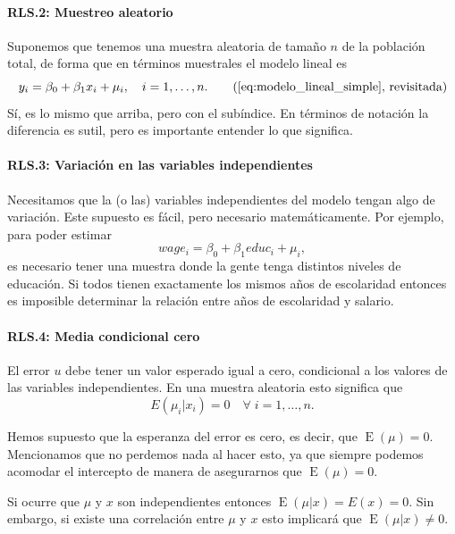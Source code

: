\documentclass[12pt]{report}\usepackage[]{graphicx}\usepackage[]{color}
\newcommand{\E}{\operatorname{E}}
\begin{document}
\paragraph{RLS.2: Muestreo aleatorio} Suponemos que tenemos una muestra aleatoria de tamaño $n$ de la población total, de forma que en términos muestrales el modelo lineal es
\begin{equation}
y_i = \beta_0 + \beta_1 x_i + \mu_i, \quad i = 1,\ldots,n. \tag{\ref{eq:modelo_lineal_simple}, revisitada}
\end{equation}
Sí, es lo mismo que arriba, pero con el subíndice. En términos de notación la diferencia es sutil, pero es importante entender lo que significa.

\paragraph{RLS.3: Variación en las variables independientes}
Necesitamos que la (o las) variables independientes del modelo tengan algo de variación.
Este supuesto es fácil, pero necesario matemáticamente.
Por ejemplo, para poder estimar
\begin{equation*}
wage_i = \beta_0 + \beta_1 educ_i + \mu_i,
\end{equation*}
es necesario tener una muestra donde la gente tenga distintos niveles de educación. Si todos tienen exactamente los mismos años de escolaridad entonces es imposible determinar la relación entre años de escolaridad y salario.

\paragraph{RLS.4: Media condicional cero}
El error $u$ debe tener un valor esperado igual a cero, condicional a los valores de las variables independientes. En una muestra aleatoria esto significa que
\begin{equation}
E(\mu_i | x_i) = 0 \quad \forall\; i = 1,\ldots, n.
\end{equation}

Hemos supuesto que la esperanza del error es cero, es decir, que $\E(\mu)=0$.
Mencionamos que no perdemos nada al hacer esto, ya que siempre podemos acomodar el intercepto de manera de asegurarnos que $\E(\mu)=0$.

Si ocurre que $\mu$ y $x$ son independientes entonces $\E(\mu | x) = E(x) = 0$.
Sin embargo, si existe una correlación entre $\mu$ y $x$ esto implicará que $\E(\mu | x) \neq 0$.
\end{document}
